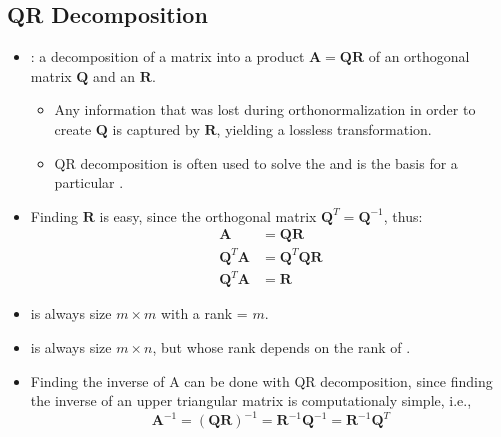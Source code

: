 \begin{itemize}
  \subsection{QR Decomposition}\label{QR Decomposition}
  \begin{itemize}
    \item {}: a decomposition of a matrix  into a product \(\bm{A}=\bm{QR}\) of an orthogonal matrix \(\bm{Q}\) and  an \hyperref[Diagonal and Triagnular Matrices]{} \(\bm{R}\).
      \begin{itemize}
        \item Any information that was lost during orthonormalization in order to create \(\bm{Q}\) is captured by \(\bm{R}\), yielding a lossless transformation.
        \item QR decomposition is often used to solve the \hyperref[Least-Squares and Model-Fitting]{} and is the basis for a particular \hyperref[Eigendecomposition]{}.
      \end{itemize}
    \item Finding \(\bm{R}\) is easy, since the orthogonal matrix \(\bm{Q}^T = \bm{Q}^{-1}\), thus:
    \begin{align*}
      \bm{A} &= \bm{QR} \\
      \bm{Q}^T \bm{A} &= \bm{Q}^T \bm{Q} \bm{R} \\
      \bm{Q}^T \bm{A} &= \bm{R}
    \end{align*}
    \item {} is always size \(m \times m\) with a rank = \(m\).
    \item {} is always size \(m \times n\), but whose rank depends on the rank of .
    \item Finding the inverse of A can be done with QR decomposition, since finding the inverse of an upper triangular matrix is computationaly simple, i.e.,
    \[%
    \bm{A}^{-1} = (\bm{QR})^{-1} = \bm{R}^{-1} \bm{Q}^{-1} =  \bm{R}^{-1} \bm{Q}^T
    \]%
  \end{itemize}
  
  
\end{itemize}
